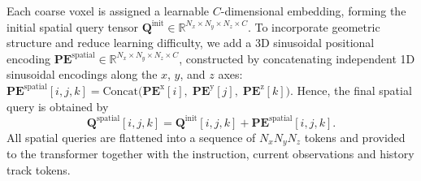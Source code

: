 Each coarse voxel is assigned a learnable $C$-dimensional embedding, forming the initial spatial query tensor $\mathbf{Q}^{\text{init}} \in \mathbb{R}^{N_x \times N_y \times N_z \times C}$. To incorporate geometric structure and reduce learning difficulty, we add a 3D sinusoidal positional encoding $\mathbf{PE}^{\text{spatial}}\in \mathbb{R}^{N_x \times N_y \times N_z \times C}$, constructed by concatenating independent 1D sinusoidal encodings along the $x$, $y$, and $z$ axes:
$
\mathbf{PE}^{\text{spatial}}[i,j,k]
= \text{Concat}\big(\mathbf{PE}^\text{x}[i],\; \mathbf{PE}^\text{y}[j],\; \mathbf{PE}^\text{z}[k]\big).
$
Hence, the final spatial query is obtained by
\begin{equation}
\mathbf{Q}^{\text{spatial}}[i,j,k]
= \mathbf{Q}^{\text{init}}[i,j,k] + \mathbf{PE}^{\text{spatial}}[i, j,k].
\end{equation}
%
All spatial queries are flattened into a sequence of  $N_x N_y  N_z$  tokens and provided to the transformer together with the instruction, current observations and history track tokens.

 


